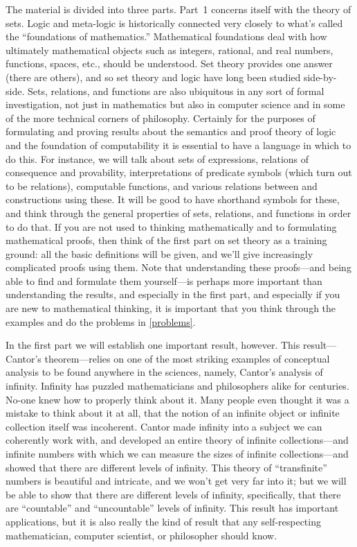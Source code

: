 The material is divided into three parts.  Part~1 concerns
itself with the theory of sets.  Logic and meta-logic is historically
connected very closely to what's called the ``foundations of
mathematics.''  Mathematical foundations deal with how ultimately
mathematical objects such as integers, rational, and real numbers,
functions, spaces, etc., should be understood.  Set theory provides
one answer (there are others), and so set theory and logic have long
been studied side-by-side.  Sets, relations, and functions are also
ubiquitous in any sort of formal investigation, not just in
mathematics but also in computer science and in some of the more
technical corners of philosophy.  Certainly for the purposes of
formulating and proving results about the semantics and proof theory
of logic and the foundation of computability it is essential to have a
language in which to do this.  For instance, we will talk about sets
of expressions, relations of consequence and provability,
interpretations of predicate symbols (which turn out to be relations),
computable functions, and various relations between and constructions
using these.  It will be good to have shorthand symbols for
these, and think through the general properties of sets, relations,
and functions in order to do that.  If you are not used to thinking
mathematically and to formulating mathematical proofs, then think of
the first part on set theory as a training ground: all the basic
definitions will be given, and we'll give increasingly complicated
proofs using them.  Note that understanding these proofs---and being
able to find and formulate them yourself---is perhaps more important
than understanding the results, and especially in the first part, and
especially if you are new to mathematical thinking, it is important
that you think through the examples and do the problems in \cref{problems}.

In the first part we will establish one important result, however.
This result---Cantor's theorem---relies on one of the most striking
examples of conceptual analysis to be found anywhere in the sciences,
namely, Cantor's analysis of infinity.  Infinity has puzzled
mathematicians and philosophers alike for centuries. No-one knew how
to properly think about it. Many people even thought it was a mistake
to think about it at all, that the notion of an infinite object or
infinite collection itself was incoherent.  Cantor made infinity into
a subject we can coherently work with, and developed an entire theory
of infinite collections---and infinite numbers with which we can
measure the sizes of infinite collections---and showed that there are
different levels of infinity.  This theory of ``transfinite'' numbers
is beautiful and intricate, and we won't get very far into it; but we
will be able to show that there are different levels of infinity,
specifically, that there are ``countable'' and ``uncountable'' levels
of infinity.  This result has important applications, but it is
also really the kind of result that any self-respecting mathematician,
computer scientist, or philosopher should know.

